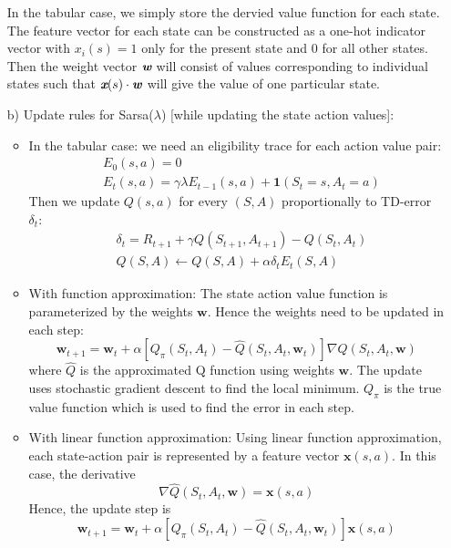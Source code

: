 \documentclass{article}
\begin{document}
\begin{enumerate}
	In the tabular case, we simply store the dervied value function for each state. The feature vector for each state can be constructed as a one-hot indicator vector with $x_i(s) = 1$ only for the present state and 0 for all other states. Then the weight vector $\textit{\textbf{w}}$ will consist of values corresponding to individual states such that $\textit{\textbf{x}}(s)\cdot\textit{\textbf{w}}$ will give the value of one particular state.
	\item[b)] Update rules for Sarsa($\lambda$) [while updating the state action values]:
	\begin{itemize}
		\item In the tabular case:
		we need an eligibility trace for each action value pair:
		\begin{equation*}
		\begin{split}
		&E_0(s,a) = 0\\
		&E_t(s,a) = \gamma\lambda E_{t-1}(s,a)+\mathbf{1}(S_t=s, A_t=a)
		\end{split}
		\end{equation*}
		Then we update $Q(s,a)$ for every $(S,A)$ proportionally to TD-error $\delta_t$:
		\begin{equation*}
		\begin{split}
			&\delta_t = R_{t+1} + \gamma Q(S_{t+1}, A_{t+1}) - Q(S_t, A_t)\\
			&Q(S, A) \leftarrow Q(S,A) + \alpha\delta_t E_t(S,A) 
		\end{split}
		\end{equation*}
		\item With function approximation:
		The state action value function is parameterized by the weights $\textbf{w}$. Hence the weights need to be updated in each step:
		\begin{equation*}
		\textbf{w}_{t+1} = \textbf{w}_t + \alpha[Q_\pi(S_t, A_t) - \hat{Q}(S_t, A_t, \textbf{w}_t)]\nabla\hat{Q}(S_t, A_t, \textbf{w})
		\end{equation*}
		where $\hat{Q}$ is the approximated Q function using weights $\textbf{w}$. The update uses stochastic gradient descent to find the local minimum. $Q_\pi$ is the true value function which is used to find the error in each step.
		\item With linear function approximation: Using linear function approximation, each state-action pair is represented by a feature vector $\textbf{x}(s,a)$. In this case, the derivative
		\begin{equation*}
		\nabla\hat{Q}(S_t, A_t, \textbf{w}) = \textbf{x}(s,a)
		\end{equation*}
		Hence, the update step is 
		\begin{equation*}
		\textbf{w}_{t+1} = \textbf{w}_t + \alpha[Q_\pi(S_t, A_t) - \hat{Q}(S_t, A_t, \textbf{w}_t)]\textbf{x}(s,a)
		\end{equation*}
	\end{itemize}
\end{enumerate}
\end{document}
